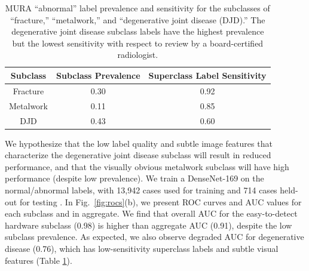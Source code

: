\documentclass[sigconf,anonymous,review]{acmart}
\begin{document}
\begin{table}[]
\centering
\begin{tabular}{ccc}
 \toprule
 Subclass & Subclass Prevalence & Superclass Label Sensitivity \\
 \toprule
 Fracture & 0.30 & 0.92   \\
 Metalwork & 0.11 & 0.85    \\
 DJD & 0.43 & 0.60 \\
 \toprule
\end{tabular}
\caption{MURA ``abnormal'' label prevalence and sensitivity for the subclasses of ``fracture,'' ``metalwork,'' and ``degenerative joint disease (DJD).'' The degenerative joint disease subclass labels have the highest prevalence but the lowest sensitivity with respect to review by a board-certified radiologist.}
\label{tab:mura2}
\end{table}

We hypothesize that the low label quality and subtle image features that characterize the degenerative joint disease subclass will result in reduced performance, and that the visually obvious metalwork subclass will have high performance (despite low prevalence).
 We train a DenseNet-169 on the normal/abnormal labels, with 13,942 cases used for training and 714 cases held-out for testing \citep{Rajpurkar2017-rc}.  
 In Fig.~\ref{fig:rocs}(b), we present ROC curves and AUC values for each subclass and in aggregate.  
 We find that overall AUC for the easy-to-detect hardware subclass (0.98) is higher than aggregate AUC (0.91), despite the low subclass prevalence.
 As expected, we also observe degraded AUC for degenerative disease (0.76), which has low-sensitivity superclass labels and subtle visual features (Table \ref{tab:mura2}).  
\end{document}
